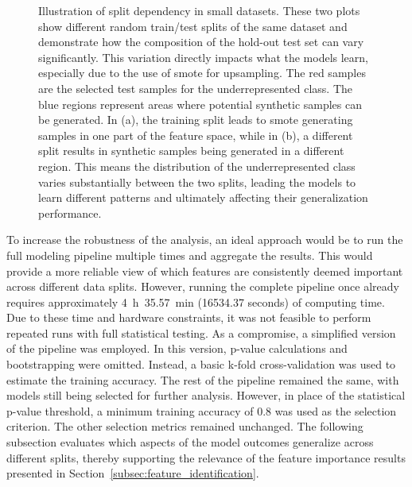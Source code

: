 \documentclass[12pt,a4paper]{report}
\begin{document}
\begin{figure}[h!]
    \caption[Illustration of Split Dependency]{Illustration of split dependency in small datasets. These two plots show different random train/test splits of the same dataset and demonstrate how the composition of the hold-out test set can vary significantly. This variation directly impacts what the models learn, especially due to the use of \gls{smote} for upsampling. The red samples are the selected test samples for the underrepresented class. The blue regions represent areas where potential synthetic samples can be generated. In (a), the training split leads to \gls{smote} generating samples in one part of the feature space, while in (b), a different split results in synthetic samples being generated in a different region. This means the distribution of the underrepresented class varies substantially between the two splits, leading the models to learn different patterns and ultimately affecting their generalization performance.}
    \label{fig:train_test_split_problem} 
\end{figure}

\noindent
To increase the robustness of the analysis, an ideal approach would be to run the full modeling pipeline multiple times and aggregate the results. This would provide a more reliable view of which features are consistently deemed important across different data splits. However, running the complete pipeline once already requires approximately 4~h~35.57~min (16534.37 seconds) of computing time. Due to these time and hardware constraints, it was not feasible to perform repeated runs with full statistical testing. As a compromise, a simplified version of the pipeline was employed. In this version, p-value calculations and bootstrapping were omitted. Instead, a basic k-fold cross-validation was used to estimate the training accuracy. The rest of the pipeline remained the same, with models still being selected for further analysis. However, in place of the statistical p-value threshold, a minimum training accuracy of 0.8 was used as the selection criterion. The other selection metrics remained unchanged. The following subsection evaluates which aspects of the model outcomes generalize across different splits, thereby supporting the relevance of the feature importance results presented in Section~\ref{subsec:feature_identification}.
\end{document}
